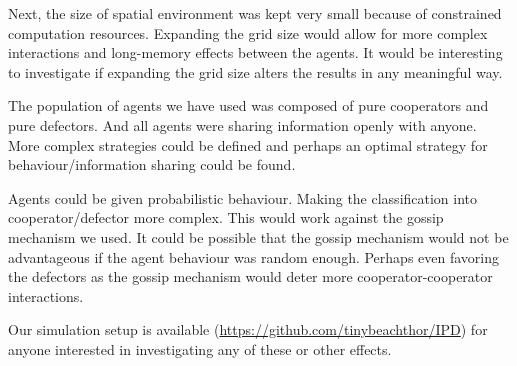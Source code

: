 \documentclass[english]{article}
\begin{document}
Next, the size of spatial environment was kept very small because of constrained computation resources. Expanding the grid size would allow for more complex interactions and long-memory effects between the agents.
It would be interesting to investigate if expanding the grid size alters the results in any meaningful way.

The population of agents we have used was composed of pure cooperators and pure defectors.
And all agents were sharing information openly with anyone.
More complex strategies could be defined and perhaps an optimal strategy for behaviour/information sharing could be found.

Agents could be given probabilistic behaviour. Making the classification into cooperator/defector more complex. This would work against the gossip mechanism we used.
It could be possible that the gossip mechanism would not be advantageous if the agent behaviour was random enough.
Perhaps even favoring the defectors as the gossip mechanism would deter more cooperator-cooperator interactions.

Our simulation setup is available
(\url{https://github.com/tinybeachthor/IPD})
for anyone interested in investigating any of these or other effects.



\pagebreak

\end{document}
